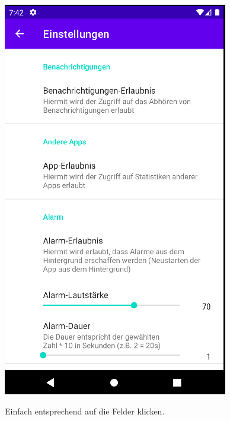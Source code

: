 \documentclass[ngerman]{tutorial}
\begin{document}
\begin{center}
    \includegraphics[scale=0.4]{settings_per.png}
\end{center}
Einfach entsprechend auf die Felder klicken.



\newpage
\end{document}
